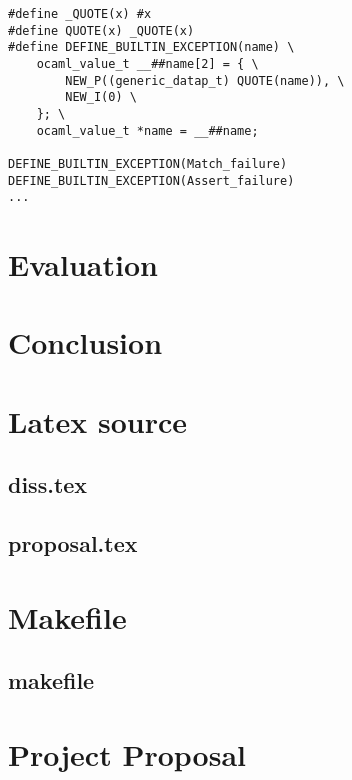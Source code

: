 \documentclass[12pt,a4paper,twoside,openright]{report}
\begin{document}
\begin{lstlisting}
#define _QUOTE(x) #x
#define QUOTE(x) _QUOTE(x)
#define DEFINE_BUILTIN_EXCEPTION(name) \
    ocaml_value_t __##name[2] = { \
        NEW_P((generic_datap_t) QUOTE(name)), \
        NEW_I(0) \
    }; \
    ocaml_value_t *name = __##name;

DEFINE_BUILTIN_EXCEPTION(Match_failure)
DEFINE_BUILTIN_EXCEPTION(Assert_failure)
...
\end{lstlisting}

\chapter{Evaluation}


\chapter{Conclusion}





\appendix

\chapter{Latex source}

\section{diss.tex}
{\scriptsize}

\section{proposal.tex}
{\scriptsize}

\chapter{Makefile}

\section{makefile}\label{makefile}



\chapter{Project Proposal}

%
\end{document}
